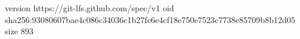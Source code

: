 version https://git-lfs.github.com/spec/v1
oid sha256:93080607bae4c086c34036c1b27fc6e4cf18e750e7523c7738e85709b8b12d05
size 893
